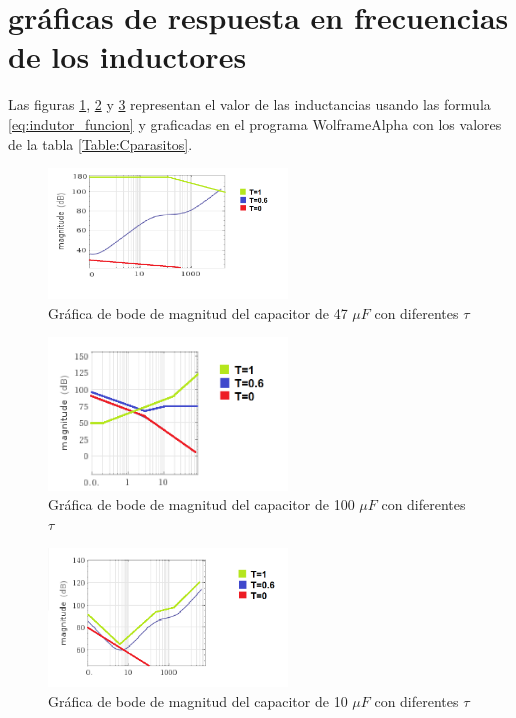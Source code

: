 \documentclass[journal]{IEEEtran}
\begin{document}
\section{gráficas de respuesta en frecuencias de los inductores}
Las figuras \ref{fig:bodeinductor47}, \ref{fig:bodeinductor100} y \ref{fig:bodeinductor10} representan el valor de las inductancias usando las formula \ref{eq:indutor_funcion} y graficadas en el programa WolframeAlpha con los valores de la tabla \ref{Table:Cparasitos}.
\begin{figure}
	\centering
	\includegraphics[width=2.5in]{img/bode47.png}
	\caption{Gráfica de bode de magnitud del capacitor de 47 \(\mu F\) con diferentes \(\tau\)}
	\label{fig:bodeinductor47}
\end{figure}
\begin{figure}
	\centering
	\includegraphics[width=2.5in]{img/bode100.png}
	\caption{Gráfica de bode de magnitud del capacitor de 100 \(\mu F\) con diferentes \(\tau\)}
	\label{fig:bodeinductor100}
\end{figure}
\begin{figure}
	\centering
	\includegraphics[width=2.5in]{img/bode10.png}
	\caption{Gráfica de bode de magnitud del capacitor de 10 \(\mu F\) con diferentes \(\tau\)}
	\label{fig:bodeinductor10}
\end{figure}

\end{document}
